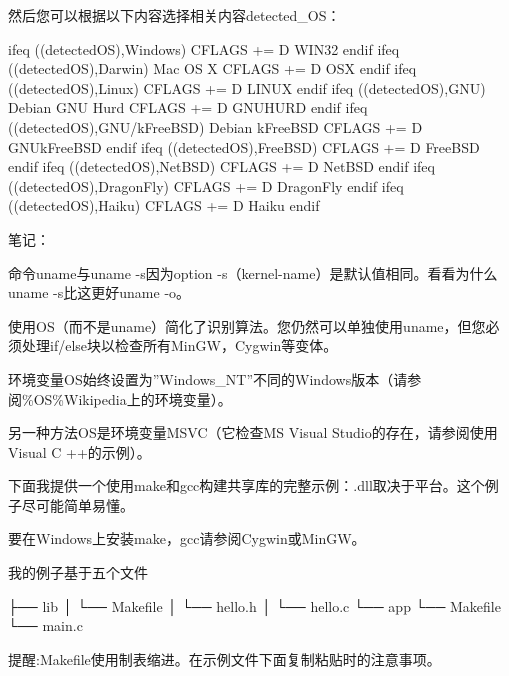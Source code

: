 \documentclass[letterpaper,12pt,english]{sphinxmanual}
\begin{document}
然后您可以根据以下内容选择相关内容detected\_OS：

\begin{sphinxVerbatim}[commandchars=\\\{\}]
ifeq (\PYGZdl{}(detected\PYGZus{}OS),Windows)
    CFLAGS += \PYGZhy{}D WIN32
endif
ifeq (\PYGZdl{}(detected\PYGZus{}OS),Darwin)        \PYGZsh{} Mac OS X
    CFLAGS += \PYGZhy{}D OSX
endif
ifeq (\PYGZdl{}(detected\PYGZus{}OS),Linux)
    CFLAGS   +=   \PYGZhy{}D LINUX
endif
ifeq (\PYGZdl{}(detected\PYGZus{}OS),GNU)           \PYGZsh{} Debian GNU Hurd
    CFLAGS   +=   \PYGZhy{}D GNU\PYGZus{}HURD
endif
ifeq (\PYGZdl{}(detected\PYGZus{}OS),GNU/kFreeBSD)  \PYGZsh{} Debian kFreeBSD
    CFLAGS   +=   \PYGZhy{}D GNU\PYGZus{}kFreeBSD
endif
ifeq (\PYGZdl{}(detected\PYGZus{}OS),FreeBSD)
    CFLAGS   +=   \PYGZhy{}D FreeBSD
endif
ifeq (\PYGZdl{}(detected\PYGZus{}OS),NetBSD)
    CFLAGS   +=   \PYGZhy{}D NetBSD
endif
ifeq (\PYGZdl{}(detected\PYGZus{}OS),DragonFly)
    CFLAGS   +=   \PYGZhy{}D DragonFly
endif
ifeq (\PYGZdl{}(detected\PYGZus{}OS),Haiku)
    CFLAGS   +=   \PYGZhy{}D Haiku
endif
\end{sphinxVerbatim}

笔记：

命令uname与uname -s因为option -s（\textendash{}kernel-name）是默认值相同。看看为什么uname -s比这更好uname -o。

使用OS（而不是uname）简化了识别算法。您仍然可以单独使用uname，但您必须处理if/else块以检查所有MinGW，Cygwin等变体。

环境变量OS始终设置为”Windows\_NT”不同的Windows版本（请参阅\%OS\%Wikipedia上的环境变量）。

另一种方法OS是环境变量MSVC（它检查MS Visual Studio的存在，请参阅使用Visual C ++的示例）。

下面我提供一个使用make和gcc构建共享库的完整示例：.dll取决于平台。这个例子尽可能简单易懂。

要在Windows上安装make，gcc请参阅Cygwin或MinGW。

我的例子基于五个文件

\begin{sphinxVerbatim}[commandchars=\\\{\}]
├── lib
│   └── Makefile
│   └── hello.h
│   └── hello.c
└── app
    └── Makefile
    └── main.c
\end{sphinxVerbatim}

提醒:Makefile使用制表缩进。在示例文件下面复制粘贴时的注意事项。
\end{document}
